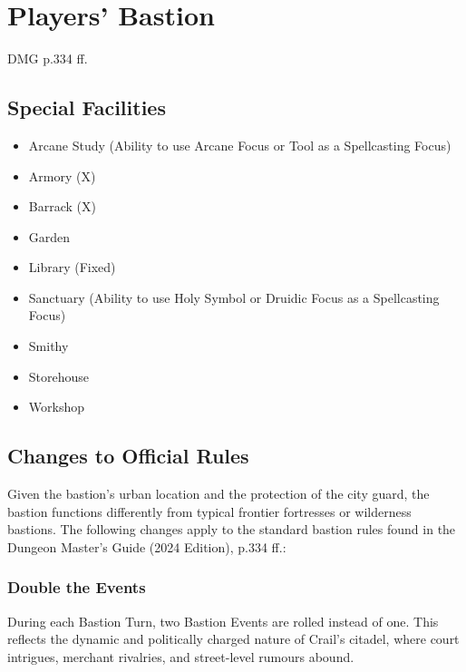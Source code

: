 \section*{Players' Bastion}
{\entryfont DMG p.334 ff.}
\subsection*{Special Facilities}
{\entryfont%
	\begin{itemize}
		\item Arcane Study (Ability to use Arcane Focus or Tool as a Spellcasting Focus)
		\item Armory (X)
		\item Barrack (X)
		\item Garden
		\item Library (Fixed)
		\item Sanctuary (Ability to use Holy Symbol or Druidic Focus as a Spellcasting Focus)
		\item Smithy
		\item Storehouse
		\item Workshop
	\end{itemize}
}%
\subsection*{Changes to Official Rules}
{\entryfont Given the bastion's urban location and the protection of the city guard, the bastion functions differently from typical frontier fortresses or wilderness bastions. The following changes apply to the standard bastion rules found in the Dungeon Master's Guide (2024 Edition), p.334 ff.:}
\subsubsection*{Double the Events}
{\entryfont During each Bastion Turn, two Bastion Events are rolled instead of one. This reflects the dynamic and politically charged nature of Crail's citadel, where court intrigues, merchant rivalries, and street-level rumours abound.}
